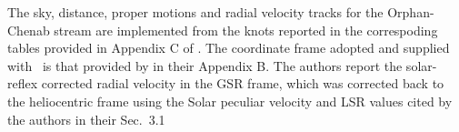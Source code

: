 The sky, distance, proper motions and radial velocity tracks for the Orphan-Chenab stream are implemented from the knots
reported in the correspoding tables provided in Appendix C of \citet{Koposov2023}.
The coordinate frame adopted and supplied with \galstreams\ is that provided by \citet{Koposov2019} in their Appendix B.
The authors report the solar-reflex corrected radial velocity in the GSR frame, which was corrected back to the heliocentric
frame using the Solar peculiar velocity and LSR values cited by the authors in their Sec.~3.1
